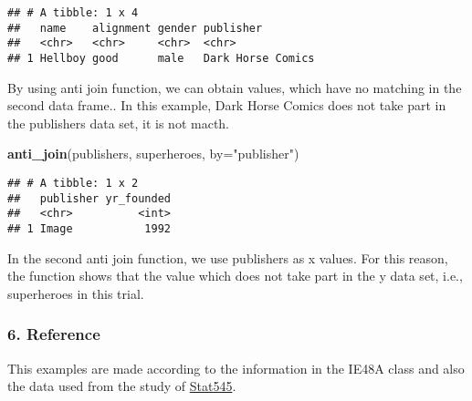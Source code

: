 \documentclass[
]{article}
\newenvironment{Shaded}{\begin{snugshade}}{\end{snugshade}}
\newcommand{\DataTypeTok}[1]{\textcolor[rgb]{0.13,0.29,0.53}{#1}}
\newcommand{\KeywordTok}[1]{\textcolor[rgb]{0.13,0.29,0.53}{\textbf{#1}}}
\newcommand{\NormalTok}[1]{#1}
\newcommand{\StringTok}[1]{\textcolor[rgb]{0.31,0.60,0.02}{#1}}
\begin{document}
\begin{verbatim}
## # A tibble: 1 x 4
##   name    alignment gender publisher        
##   <chr>   <chr>     <chr>  <chr>            
## 1 Hellboy good      male   Dark Horse Comics
\end{verbatim}

By using anti join function, we can obtain values, which have no
matching in the second data frame.. In this example, Dark Horse Comics
does not take part in the publishers data set, it is not macth.

\begin{Shaded}
\begin{Highlighting}[]
\KeywordTok{anti\_join}\NormalTok{(publishers, superheroes, }\DataTypeTok{by=}\StringTok{"publisher"}\NormalTok{)}
\end{Highlighting}
\end{Shaded}

\begin{verbatim}
## # A tibble: 1 x 2
##   publisher yr_founded
##   <chr>          <int>
## 1 Image           1992
\end{verbatim}

In the second anti join function, we use publishers as x values. For
this reason, the function shows that the value which does not take part
in the y data set, i.e., superheroes in this trial.

\hypertarget{reference}{%
\subsubsection{6. Reference}\label{reference}}

This examples are made according to the information in the IE48A class
and also the data used from the study of
\href{https://stat545.com/join-cheatsheet.html}{Stat545}.
\end{document}
